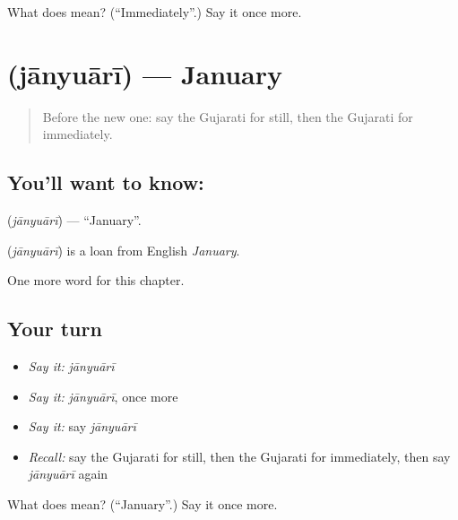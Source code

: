 \begin{tcolorbox}[breakable,colback=teal!4,colframe=teal!35!black,title={Before you move on}]
What does  mean? (\textquotedblleft{}Immediately\textquotedblright{}.) Say it once more.
\end{tcolorbox}
\section[\texorpdfstring{\gu{જાન્યુઆરી} (jānyuārī)}{જાન્યુઆરી (jānyuārī)}]{ (jānyuārī) — January}

\label{lesson:GU-C95-janyuari}



\begin{quote}
Before the new one: say the Gujarati for still, then the Gujarati for immediately.
\end{quote}

\subsection*{You'll want to know: }
\textbf{} (\emph{jānyuārī}) — \textquotedblleft{}January\textquotedblright{}.

\begin{cousinweb}
\textbf{} (\emph{jānyuārī}) is a loan from English \emph{January}.
\end{cousinweb}

\begin{grammarlens}[title={What you've built}]
One more word for this chapter.
\end{grammarlens}

\subsection*{Your turn}
\begin{itemize}
\raggedright
  \item \emph{Say it:} \emph{jānyuārī}
  \item \emph{Say it:} \emph{jānyuārī}, once more
  \item \emph{Say it:} say \emph{jānyuārī}
  \item \emph{Recall:} say the Gujarati for still, then the Gujarati for immediately, then say \emph{jānyuārī} again
\end{itemize}

\begin{tcolorbox}[breakable,colback=teal!4,colframe=teal!35!black,title={Before you move on}]
What does  mean? (\textquotedblleft{}January\textquotedblright{}.) Say it once more.
\end{tcolorbox}
